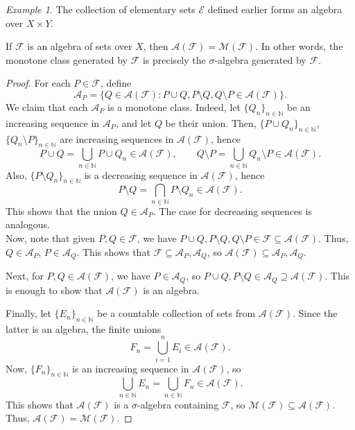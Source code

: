 \documentclass[11pt]{article}
\newcommand{\N}{\mathbb{N}}
\newcommand{\M}{\mathcal{M}}
\theoremstyle{definition}
\theoremstyle{remark}
\newtheorem*{example}{Example}
\numberwithin{equation}{section}
\begin{document}
    \begin{example}
        The collection of elementary sets $\mathcal{E}$ defined earlier forms an
        algebra over $X \times Y$.
    \end{example}


    \begin{theorem}
        If $\mathcal{F}$ is an algebra of sets over $X$, then
        $\mathcal{A}(\mathcal{F}) = \mathcal{M}(\mathcal{F})$. In other words, the
        monotone class generated by $\mathcal{F}$ is precisely the $\sigma$-algebra
        generated by $\mathcal{F}$.
    \end{theorem}
    \begin{proof}
        For each $P \in \mathcal{F}$, define \[
            \mathcal{A}_P = \{Q \in \mathcal{A}(\mathcal{F}): P\cup Q, P\setminus Q,
            Q\setminus P \in \mathcal{A}(\mathcal{F})\}.
        \] We claim that each $\mathcal{A}_P$ is a monotone class. Indeed, let
        $\{Q_n\}_{n \in \N}$ be an increasing sequence in $\mathcal{A}_P$, and let
        $Q$ be their union. Then, $\{P\cup Q_n\}_{n \in \N}$, $\{Q_n \setminus P\}_{n
        \in \N}$ are increasing sequences in $\mathcal{A}(\mathcal{F})$, hence \[
            P \cup Q = \bigcup_{n \in \N} P\cup Q_n \in \mathcal{A}(\mathcal{F}), \qquad
            Q\setminus P = \bigcup_{n \in \N} Q_n\setminus P \in
            \mathcal{A}(\mathcal{F}).
        \] Also, $\{P\setminus Q_n\}_{n \in \N}$ is a decreasing sequence in
        $\mathcal{A}(\mathcal{F})$, hence \[
            P\setminus Q = \bigcap_{n \in \N} P\setminus Q_n \in
            \mathcal{A}(\mathcal{F}).
        \] This shows that the union $Q \in \mathcal{A}_P$. The case for decreasing
        sequences is analogous. \\

        Now, note that given $P, Q \in \mathcal{F}$, we have $P \cup Q, P\setminus Q,
        Q\setminus P \in \mathcal{F} \subseteq \mathcal{A}(\mathcal{F})$. Thus, $Q
        \in \mathcal{A}_P$, $P \in \mathcal{A}_Q$. This shows that $\mathcal{F}
        \subseteq \mathcal{A}_P, \mathcal{A}_Q$, so $\mathcal{A}(\mathcal{F})
        \subseteq \mathcal{A}_P, \mathcal{A}_Q$.

        Next, for $P, Q \in \mathcal{A}(\mathcal{F})$, we have $P \in \mathcal{A}_Q$,
        so $P \cup Q, P\setminus Q \in \mathcal{A}_Q \supseteq
        \mathcal{A}(\mathcal{F})$. This is enough to show that
        $\mathcal{A}(\mathcal{F})$ is an algebra.

        Finally, let $\{E_n\}_{n \in \N}$ be a countable collection of sets from
        $\mathcal{A}(\mathcal{F})$. Since the latter is an algebra, the finite unions
        \[
            F_n = \bigcup_{i = 1}^n E_i \in \mathcal{A}(\mathcal{F}).
        \] Now, $\{F_n\}_{n \in \N}$ is an increasing sequence in
        $\mathcal{A}(\mathcal{F})$, so \[
            \bigcup_{n \in \N} E_n = \bigcup_{n \in \N} F_n \in
            \mathcal{A}(\mathcal{F}).
        \] This shows that $\mathcal{A}(\mathcal{F})$ is a $\sigma$-algebra
        containing $\mathcal{F}$, so $\M(\mathcal{F}) \subseteq
        \mathcal{A}(\mathcal{F})$. Thus, $\mathcal{A}(\mathcal{F}) =
        \M(\mathcal{F})$.
    \end{proof}
\end{document}
